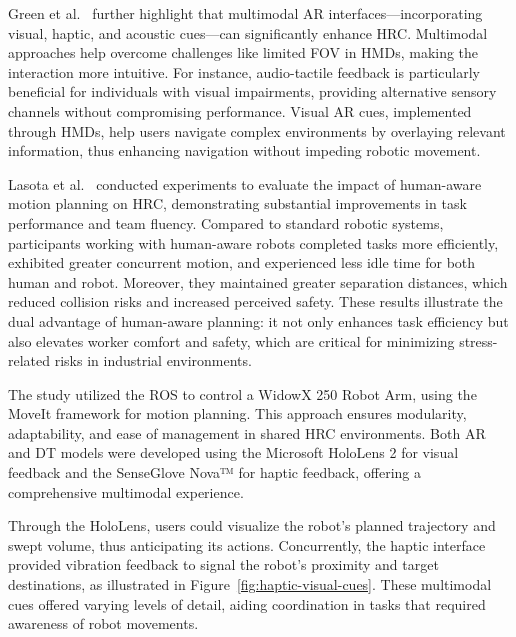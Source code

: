 Green et al.~\cite{doi:10.5772/5664} further highlight that multimodal \ac{AR} interfaces—incorporating visual, haptic, and acoustic cues—can significantly enhance \ac{HRC}. Multimodal approaches help overcome challenges like limited \ac{FOV} in \ac{HMDs}, making the interaction more intuitive. For instance, audio-tactile feedback is particularly beneficial for individuals with visual impairments, providing alternative sensory channels without compromising performance. Visual \ac{AR} cues, implemented through \ac{HMDs}, help users navigate complex environments by overlaying relevant information, thus enhancing navigation without impeding robotic movement.


Lasota et al.~\cite{doi:10.1177/0018720814565188} conducted experiments to evaluate the impact of human-aware motion planning on \ac{HRC}, demonstrating substantial improvements in task performance and team fluency. Compared to standard robotic systems, participants working with human-aware robots completed tasks more efficiently, exhibited greater concurrent motion, and experienced less idle time for both human and robot. Moreover, they maintained greater separation distances, which reduced collision risks and increased perceived safety. These results illustrate the dual advantage of human-aware planning: it not only enhances task efficiency but also elevates worker comfort and safety, which are critical for minimizing stress-related risks in industrial environments.


The study utilized the \ac{ROS} to control a WidowX 250 Robot Arm, using the MoveIt framework for motion planning. This approach ensures modularity, adaptability, and ease of management in shared \ac{HRC} environments. Both \ac{AR} and \ac{DT} models were developed using the Microsoft HoloLens 2 for visual feedback and the SenseGlove Nova™ for haptic feedback, offering a comprehensive multimodal experience.

Through the HoloLens, users could visualize the robot's planned trajectory and swept volume, thus anticipating its actions. Concurrently, the haptic interface provided vibration feedback to signal the robot's proximity and target destinations, as illustrated in Figure~\ref{fig:haptic-visual-cues}. These multimodal cues offered varying levels of detail, aiding coordination in tasks that required awareness of robot movements.

